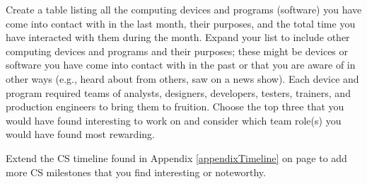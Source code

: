 \begin{ex}
	Create a table listing all the computing devices and programs (software) you have come into contact with in the last month, their purposes, and the total time you have interacted with them during the month. Expand your list to include other computing devices and programs and their purposes; these might be devices or software you have come into contact with in the past or that you are aware of in other ways (e.g., heard about from others, saw on a news show). Each device and program required teams of analysts, designers, developers, testers, trainers, and production engineers to bring them to fruition. Choose the top three that you would have found interesting to work on and consider which team role(s) you would have found most rewarding.
	 
\end{ex}

\begin{ex}\label{exCh18Timeline}
	Extend the CS timeline found in Appendix \ref{appendixTimeline} on page \pageref{appendixTimeline} to add more CS milestones that you find interesting or noteworthy.
\end{ex}